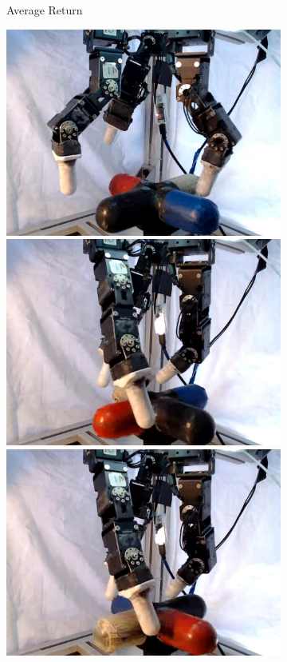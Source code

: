 \begin{figure}[t]
    
    \centering
    \begin{subfigure}[b]{0.02\textwidth}
        \center
        \begin{turn}{90} 
            \footnotesize
            Average Return
        \end{turn}
        \vspace{0.8cm}
    \end{subfigure}
    \begin{subfigure}[b]{0.28\textwidth}
        \center
        
        \includegraphics[height=0.22\linewidth]{awac/figures/filmstrip_claw/claw_vid_100.jpg}
        \includegraphics[height=0.22\linewidth]{awac/figures/filmstrip_claw/claw_vid_300.jpg}
        \includegraphics[height=0.22\linewidth]{awac/figures/filmstrip_claw/claw_vid_400.jpg}
        \vspace{0.1cm}


\end{subfigure}
\end{figure}
